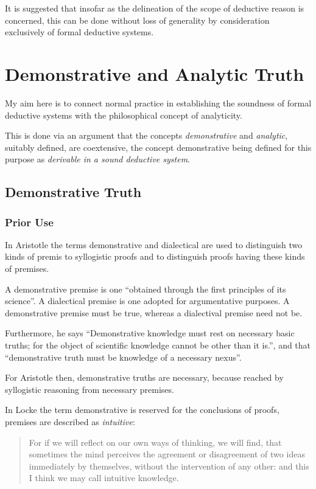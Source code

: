 \documentclass[numreferences]{rbjk}
\begin{document}
\begin{article}
It is suggested that insofar as the delineation of the scope of deductive reason is concerned, this can be done without loss of generality by consideration exclusively of formal deductive systems.

\section{Demonstrative and Analytic Truth}

My aim here is to connect normal practice in establishing the soundness of formal deductive systems with the philosophical concept of analyticity.

This is done via an argument that the concepts {\it demonstrative} and {\it analytic}, suitably defined, are coextensive, the concept demonstrative being defined for this purpose as {\it derivable in a sound deductive system}.

\subsection{Demonstrative Truth}

\subsubsection{Prior Use}

In Aristotle the terms demonstrative and dialectical are used to distinguish two kinds of premis to syllogistic proofs and to distinguish proofs having these kinds of premises.

A demonstrative premise is one ``obtained through the first principles of its science''.
A dialectical premise is one adopted for argumentative purposes.
A demonstrative premise must be true, whereas a dialectival premise need not be.
 
Furthermore, he says ``Demonstrative knowledge must rest on necessary basic truths; for the object of scientific knowledge cannot be other than it is.'', and that ``demonstrative truth must be knowledge of a necessary nexus''.

For Aristotle then, demonstrative truths are necessary, because reached by syllogistic reasoning from necessary premises.

In Locke the term demonstrative is reserved for the conclusions of proofs, premises are described as {\it intuitive}:

\begin{quote}
For if we will reflect on our own ways of thinking, we will find, that sometimes the mind perceives the agreement or disagreement of two ideas immediately by themselves, without the intervention of any other: and this I think we may call intuitive knowledge.
\end{quote}


\end{article}
\end{document}
